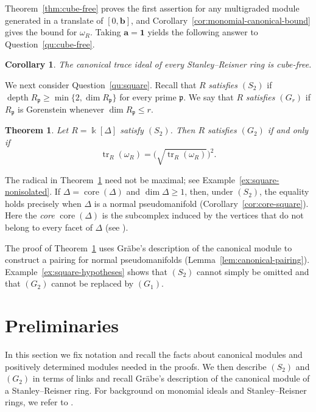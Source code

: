 \documentclass[a4paper,11pt]{amsart}
\theoremstyle{plain}
\newtheorem{maintheoremb}[maintheorema]{Theorem}
\newtheorem{introcorollary}{Corollary}
\theoremstyle{definition}
\theoremstyle{remark}
\DeclareMathOperator{\tr}{tr}
\DeclareMathOperator{\core}{core}
\newcommand{\kk}{\Bbbk}
\newcommand{\one}{\mathbf1}
\begin{document}
Theorem~\ref{thm:cube-free} proves the first assertion for any multigraded module generated in a translate of $[0,\mathbf{b}]$, and Corollary~\ref{cor:monomial-canonical-bound} gives the bound for $\omega_R$. Taking $\mathbf{a}=\one$ yields the following answer to Question~\ref{qu:cube-free}.

\begin{introcorollary}\label{cor:intro-cube-free}
The canonical trace ideal of every Stanley--Reisner ring is cube-free.
\end{introcorollary}

We next consider Question~\ref{qu:square}. Recall that $R$ \emph{satisfies $(S_2)$} if $\operatorname{depth}R_{\mathfrak p}\geq\min\{2,\dim R_{\mathfrak p}\}$ for every prime $\mathfrak p$. We say that $R$ \emph{satisfies $(G_r)$} if $R_{\mathfrak p}$ is Gorenstein whenever $\dim R_{\mathfrak p}\leq r$.

\begin{maintheoremb}\label{thm:main-b}
Let $R=\kk[\Delta]$ satisfy $(S_2)$. Then $R$ satisfies $(G_2)$ if and only if
\[
\tr_R(\omega_R)=\bigl(\sqrt{\tr_R(\omega_R)}\bigr)^2.
\]
\end{maintheoremb}

The radical in Theorem~\ref{thm:main-b} need not be maximal; see Example~\ref{ex:square-nonisolated}. If $\Delta=\core(\Delta)$ and $\dim\Delta\geq1$, then, under $(S_2)$, the equality holds precisely when $\Delta$ is a normal pseudomanifold (Corollary~\ref{cor:core-square}). Here the \emph{core} $\core(\Delta)$ is the subcomplex induced by the vertices that do not belong to every facet of $\Delta$ (see \cite[pp.~64--65]{Sta96}).

The proof of Theorem~\ref{thm:main-b} uses Gr\"abe's description of the canonical module to construct a pairing for normal pseudomanifolds (Lemma~\ref{lem:canonical-pairing}). Example~\ref{ex:square-hypotheses} shows that $(S_2)$ cannot simply be omitted and that $(G_2)$ cannot be replaced by $(G_1)$.

\section{Preliminaries}\label{sec:preliminaries}

In this section we fix notation and recall the facts about canonical modules and positively determined modules needed in the proofs. We then describe $(S_2)$ and $(G_2)$ in terms of links and recall Gr\"abe's description of the canonical module of a Stanley--Reisner ring. For background on monomial ideals and Stanley--Reisner rings, we refer to \cite{BH98,HH11}.
\end{document}
